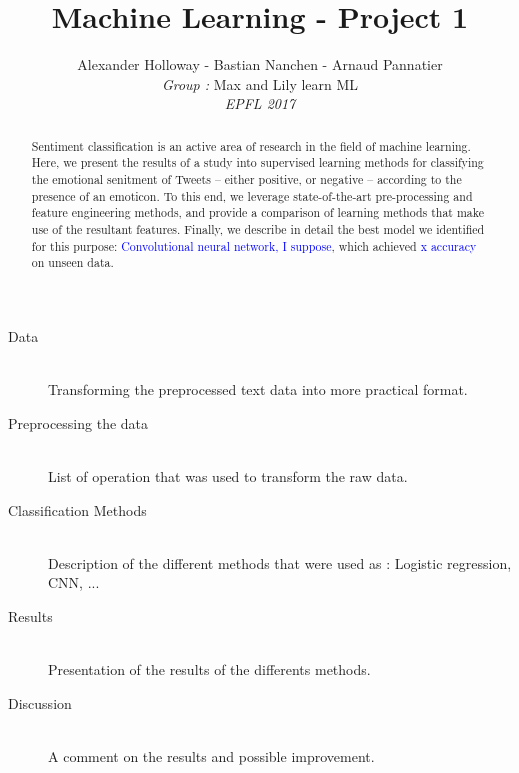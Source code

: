 \documentclass[10pt,conference,compsocconf]{IEEEtran}
\begin{document}
\title{Machine Learning - Project 1}
\author{
 Alexander Holloway - Bastian Nanchen - Arnaud Pannatier 
  \\
  \textit{Group : }Max and Lily learn ML \\
  \textit{EPFL 2017}
}
\maketitle

\begin{abstract}
Sentiment classification is an active area of research in the field of machine learning. Here, we present the results of a study into supervised learning methods for classifying the emotional senitment of Tweets -- either positive, or negative -- according to the presence of an emoticon. To this end, we leverage state-of-the-art pre-processing and feature engineering methods, and provide a comparison of learning methods that make use of the resultant features. Finally, we describe in detail the best model we identified for this purpose: \textcolor{blue}{Convolutional neural network, I suppose}, which achieved \textcolor{blue}{x accuracy} on unseen data.
\end{abstract}

\begin{description}
\item[Data] \ \\
Transforming the preprocessed text data into more practical format. 
\item[Preprocessing the data] \ \\
List of operation that was used to transform the raw data.
\item[Classification Methods] \ \\
Description of the different methods that were used as : Logistic regression, CNN, ...
\item[Results] \ \\
Presentation of the results of the differents methods.
\item[Discussion] \ \\
 A comment on the results and possible improvement.  
\end{description}









\end{document}
